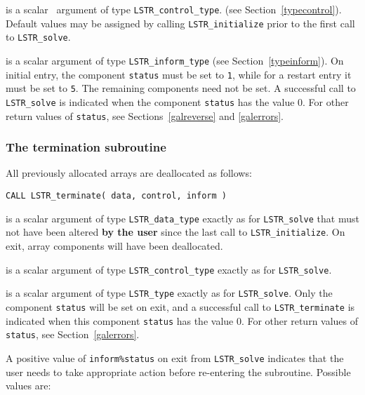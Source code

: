 \documentclass{galahad}
\newcommand{\packagename}{LS\-TR}
\begin{document}
\begin{description}
 is a scalar \intentin\ argument of type
{\tt \packagename\_control\_type}.
(see Section~\ref{typecontrol}).
Default values may be assigned by calling {\tt \packagename\_initialize}
prior to the first call to {\tt \packagename\_solve}.

 is a scalar \intentinout argument of type
{\tt \packagename\_inform\_type}
(see Section~\ref{typeinform}).
On initial entry, the component {\tt status} must be set to {\tt 1},
while for a restart entry it must be set to {\tt 5}.
The remaining components need not be set.
A successful call to
{\tt \packagename\_solve}
is indicated when the  component {\tt status} has the value 0.
For other return values of {\tt status}, see Sections~\ref{galreverse}
and \ref{galerrors}.
\end{description}


\subsubsection{The  termination subroutine}
All previously allocated arrays are deallocated as follows:

\hskip0.5in
{\tt CALL \packagename\_terminate( data, control, inform )}

\begin{description}

 is a scalar \intentinout argument of type
{\tt \packagename\_data\_type}
exactly as for
{\tt \packagename\_solve}
that must not have been altered {\bf by the user} since the last call to
{\tt \packagename\_initialize}.
On exit, array components will have been deallocated.

 is a scalar \intentin argument of type
{\tt \packagename\_control\_type}
exactly as for
{\tt \packagename\_solve}.

 is a scalar \intentout argument of type {\tt \packagename\_type}
exactly as for
{\tt \packagename\_solve}.
Only the component {\tt status} will be set on exit, and a
successful call to
{\tt \packagename\_terminate}
is indicated when this  component {\tt status} has the value 0.
For other return values of {\tt status}, see Section~\ref{galerrors}.

\end{description}


\galreverse
A positive value of {\tt inform\%status} on exit from
{\tt \packagename\_solve} indicates that the user needs to take appropriate
action before re-entering the subroutine. Possible values are:
\end{document}
